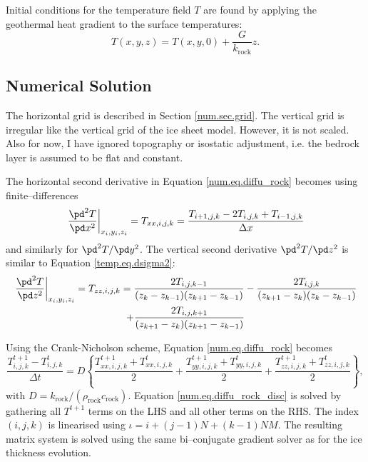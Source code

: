 Initial conditions for the temperature field $T$ are found by applying the geothermal heat gradient to the surface temperatures:
\begin{equation}
  T(x,y,z)=T(x,y,0)+\frac{G}{k_{\text{rock}}}z.
\end{equation}

\subsection{Numerical Solution}
The horizontal grid is described in Section \ref{num.sec.grid}. The vertical grid is irregular like the vertical grid of the ice sheet model. However, it is not scaled. Also for now, I have ignored topography or isostatic adjustment, i.e. the bedrock layer is assumed to be flat and constant.

The horizontal second derivative in Equation \eqref{num.eq.diffu_rock} becomes using finite--differences
\begin{equation}
  \left.\frac{\pd^2T}{\pd x^2}\right|_{x_i,y_i,z_i} = T_{xx,i,j,k} = \frac{T_{i+1,j,k}-2T_{i,j,k}+T_{i-1,j,k}}{\Delta x}
\end{equation}
and similarly for $\pd^2T/\pd y^2$. The vertical second derivative $\pd^2T/\pd z^2$ is similar to Equation \eqref{temp.eq.dsigma2}:
\begin{multline}
  \left.\frac{\pd^2 T}{\pd z^2}\right|_{x_i,y_i,z_i} = T_{zz,i,j,k} = \frac{2T_{i,j,k-1}}{(z_k-z_{k-1})(z_{k+1}-z_{k-1})} - \frac{2T_{i,j,k}}{(z_{k+1}-z_k)(z_k-z_{k-1})}\\
  + \frac{2T_{i,j,k+1}}{(z_{k+1}-z_k)(z_{k+1}-z_{k-1})}
\end{multline}


Using the Crank-Nicholson scheme, Equation \eqref{num.eq.diffu_rock} becomes
\begin{equation}
  \label{num.eq.diffu_rock_disc}
  \frac{T_{i,j,k}^{t+1}-T_{i,j,k}^{t}}{\Delta t}=D\left\{\frac{T_{xx,i,j,k}^{t+1}+T_{xx,i,j,k}^{t}}2 + \frac{T_{yy,i,j,k}^{t+1}+T_{yy,i,j,k}^{t}}2 + \frac{T_{zz,i,j,k}^{t+1}+T_{zz,i,j,k}^{t}}2 \right\},
\end{equation}
with $D=k_{\text{rock}}/(\rho_{\text{rock}}c_{\text{rock}})$. Equation \eqref{num.eq.diffu_rock_disc} is solved by gathering all $T^{t+1}$ terms on the LHS and all other terms on the RHS. The index $(i,j,k)$ is linearised using $\iota = i+(j-1)N+(k-1)NM$. The resulting matrix system is solved using the same bi--conjugate gradient solver as for the ice thickness evolution.

